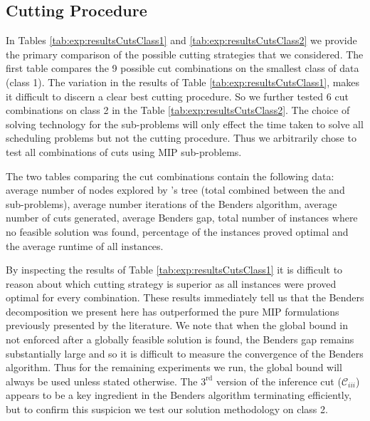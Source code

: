 \subsection{Cutting Procedure}
\label{sec:exp:cuttngProcedure}
In Tables \ref{tab:exp:resultsCutsClass1} and \ref{tab:exp:resultsCutsClass2}
we provide the primary comparison of the possible cutting strategies
that we considered.
The first table compares the 9 possible cut combinations on the smallest
class of data (class 1).
The variation in the results of Table \ref{tab:exp:resultsCutsClass1},
makes it difficult to discern a
clear best cutting procedure.
So we further tested 6 cut combinations
on class 2 in the Table \ref{tab:exp:resultsCutsClass2}.
The choice of solving technology for the sub-problems 
will only effect the time taken to solve all scheduling problems
but not the cutting procedure.
Thus we arbitrarily chose to test all combinations of cuts using MIP
sub-problems.

The two tables comparing the cut combinations contain
the following data:
average number of nodes explored by \gurobi's
\bab tree (total combined between the \rmp{} and sub-problems),
average number iterations of the Benders algorithm,
average number of cuts generated,
average Benders gap,
total number of instances where no feasible solution was found,
percentage of the instances proved optimal and
the average runtime of all instances.

By inspecting the results of Table \ref{tab:exp:resultsCutsClass1}
it is difficult to reason about which cutting strategy is superior
as all instances were proved optimal for every combination.
These results immediately tell us that the Benders decomposition
we present here has outperformed the pure MIP formulations
previously presented by the literature.
We note that when the global bound in not enforced after
a globally feasible solution is found, the Benders gap
remains substantially large and so it is difficult
to measure the convergence of the Benders algorithm.
Thus for the remaining experiments we run, the global bound
will always be used unless stated otherwise.
The $3^{\text{rd}}$ version of the inference cut ($\mathcal{C}_{iii}$) appears to
be a key ingredient in the Benders algorithm terminating efficiently,
but to confirm this suspicion we test our solution
methodology on class 2.

